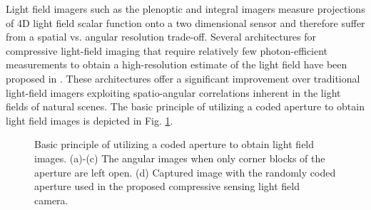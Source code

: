 \documentclass[journal]{IEEEtran}
\begin{document}
Light field imagers such as the plenoptic and integral imagers measure projections of 4D light field scalar function onto a two dimensional sensor and therefore suffer from a spatial vs. angular resolution trade-off. Several architectures for compressive light-field imaging that require relatively few photon-efficient measurements to obtain a high-resolution estimate of the light field have been proposed in \cite{Ashok2010, Babacan2012, Marwah2013}. These architectures offer a significant improvement over traditional light-field imagers exploiting spatio-angular correlations inherent in the light fields of natural scenes. The basic principle of utilizing a coded aperture to obtain light field images is depicted in Fig. \ref{fig:light_field_cs}.
%
\begin{figure}
	\centering
	
	\caption{Basic principle of utilizing a coded aperture to obtain light field images. (a)-(c) The angular images when only corner blocks of the aperture are left open. (d) Captured image with the randomly coded aperture used in the proposed compressive sensing light field camera. \cite{Babacan2012}}
	
	\label{fig:light_field_cs}
\end{figure}
\end{document}
